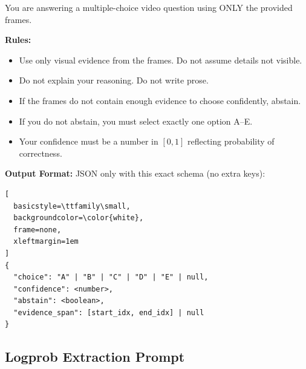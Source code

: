 \documentclass{article}
\begin{document}
\begin{tcolorbox}[
  colback=gray!5,
  colframe=gray!50,
  fonttitle=\bfseries\small,
  title=JSON Prompt for Self-Reported Confidence (v1),
  boxrule=0.5pt,
  arc=2pt,
  left=6pt,
  right=6pt,
  top=4pt,
  bottom=4pt
]
\small\ttfamily
You are answering a multiple-choice video question using ONLY the provided frames.

\vspace{0.5em}
\normalfont\small\textbf{Rules:}
\begin{itemize}[leftmargin=1.5em, itemsep=2pt, topsep=2pt]
  \item Use only visual evidence from the frames. Do not assume details not visible.
  \item Do not explain your reasoning. Do not write prose.
  \item If the frames do not contain enough evidence to choose confidently, abstain.
  \item If you do not abstain, you must select exactly one option A--E.
  \item Your confidence must be a number in $[0,1]$ reflecting probability of correctness.
\end{itemize}

\vspace{0.5em}
\normalfont\small\textbf{Output Format:} JSON only with this exact schema (no extra keys):

\vspace{0.3em}
\begin{lstlisting}[
  basicstyle=\ttfamily\small,
  backgroundcolor=\color{white},
  frame=none,
  xleftmargin=1em
]
{
  "choice": "A" | "B" | "C" | "D" | "E" | null,
  "confidence": <number>,
  "abstain": <boolean>,
  "evidence_span": [start_idx, end_idx] | null
}
\end{lstlisting}
\end{tcolorbox}

\subsection{Logprob Extraction Prompt}
\end{document}
